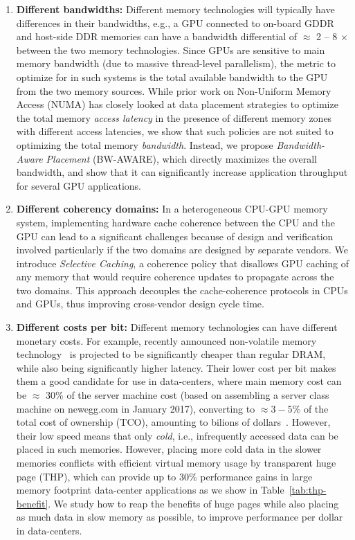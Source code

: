 \begin{enumerate}
\item
\textbf{Different bandwidths:}
Different memory technologies will typically have differences in their
bandwidths, e.g., a GPU connected to on-board GDDR and host-side DDR memories
can have a bandwidth differential of $\approx$ 2 -- 8 $\times$ between the two
memory technologies. Since GPUs are sensitive to main memory bandwidth (due to
massive thread-level parallelism), the
metric to optimize for in such systems is the total available bandwidth to the
GPU from the two memory sources. While prior work on Non-Uniform Memory Access
(NUMA) has closely looked at data placement strategies to optimize the total
memory {\it access latency} in the presence of different memory zones with
different access latencies, we show that such policies are not suited to
optimizing the total memory {\it bandwidth}. Instead, we propose {\it
Bandwidth-Aware Placement} (BW-AWARE), which directly maximizes the overall
bandwidth, and show that it can significantly increase application throughput
for several GPU applications.

\item
\textbf{Different coherency domains:} 
In a heterogeneous CPU-GPU memory system, implementing hardware cache coherence
between the CPU and the GPU can lead to a significant challenges because of
design and verification involved particularly if the two domains are designed by
separate vendors. We introduce {\it Selective Caching}, a coherence policy that
disallows GPU caching of any memory that would require coherence updates to
propagate across the two domains. This approach decouples the cache-coherence
protocols in CPUs and GPUs, thus improving cross-vendor design cycle time.

\item
\textbf{Different costs per bit:}
Different memory technologies can have different monetary costs.  For example,
recently announced non-volatile memory technology~\cite{xpoint} is projected to
be significantly cheaper than regular DRAM, while also being significantly
higher latency. Their lower cost per bit makes them a good candidate for use in
data-centers, where main memory cost can be $\approx$ 30\% of the server machine
cost (based on assembling a server class machine on newegg.com in January 2017),
converting to $\approx 3-5\%$ of the total cost of ownership (TCO), amounting to
bilions of dollars~\cite{borosso2013}. However, their low speed means that only
{\it cold}, i.e., infrequently accessed data can be placed in such memories.
However, placing more cold data in the slower memories conflicts with efficient
virtual memory usage by transparent huge page (THP), which can provide up to 30\%
performance gains in large memory footprint data-center
applications as we show in Table~\ref{tab:thp-benefit}. We study how to reap the benefits of huge
pages while also placing as much data in slow memory as possible, to improve
performance per dollar in data-centers.  \end{enumerate}

